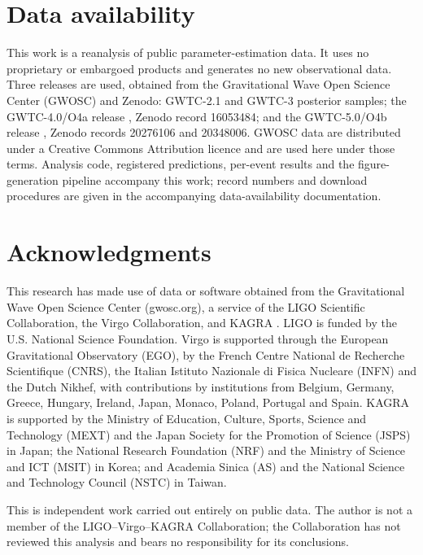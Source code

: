 \documentclass[aps,prd,twocolumn,amsmath,amssymb,nofootinbib,superscriptaddress]{revtex4-2}
\begin{document}
\section*{Data availability}
This work is a reanalysis of public parameter-estimation data. It uses no proprietary or embargoed
products and generates no new observational data. Three releases are used, obtained from the Gravitational
Wave Open Science Center (GWOSC) \citep{GWOSCthree} and Zenodo: GWTC-2.1 \citep{GWTC21} and GWTC-3
\citep{GWTC3} posterior samples; the GWTC-4.0/O4a release \citep{GWTC4}, Zenodo record 16053484; and the
GWTC-5.0/O4b release \citep{GWTC5}, Zenodo records 20276106 and 20348006. GWOSC data are distributed under
a Creative Commons Attribution licence and are used here under those terms. Analysis code, registered
predictions, per-event results and the figure-generation pipeline accompany this work; record numbers and
download procedures are given in the accompanying data-availability documentation.

\section*{Acknowledgments}
This research has made use of data or software obtained from the
Gravitational Wave Open Science Center (gwosc.org), a service of the LIGO Scientific Collaboration, the
Virgo Collaboration, and KAGRA
\citep{GWOSCthree,GWOSCfourA,GWOSCfourB}. LIGO is funded by the U.S. National Science Foundation. Virgo is
supported through the European Gravitational Observatory (EGO), by the French Centre National de Recherche
Scientifique (CNRS), the Italian Istituto Nazionale di Fisica Nucleare (INFN) and the Dutch Nikhef, with
contributions by institutions from Belgium, Germany, Greece, Hungary, Ireland, Japan, Monaco, Poland,
Portugal and Spain. KAGRA is supported by the Ministry of Education, Culture, Sports, Science and
Technology (MEXT) and the Japan Society for the Promotion of Science (JSPS) in Japan; the National Research
Foundation (NRF) and the Ministry of Science and ICT (MSIT) in Korea; and Academia Sinica (AS) and the
National Science and Technology Council (NSTC) in Taiwan.

This is independent work carried out entirely on public data. The author is not a member of the
LIGO--Virgo--KAGRA Collaboration; the Collaboration has not reviewed this
analysis and bears no responsibility for its conclusions.
\end{document}
